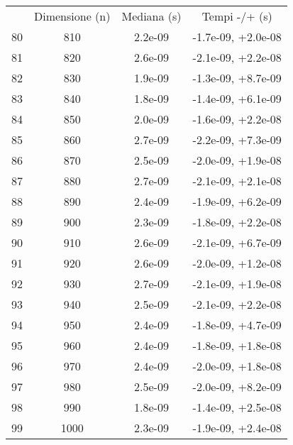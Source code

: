 \begin{table}
\centering
\begin{adjustbox}{width=1\textwidth/2}
\begin{tabular}{|c|c|c|c|}
\hline
 & Dimensione (n) & Mediana (s) & Tempi -/+ (s) \\
80 & 810 & 2.2e-09 & -1.7e-09, +2.0e-08 \\
\cline{1-4}
81 & 820 & 2.6e-09 & -2.1e-09, +2.2e-08 \\
\cline{1-4}
82 & 830 & 1.9e-09 & -1.3e-09, +8.7e-09 \\
\cline{1-4}
83 & 840 & 1.8e-09 & -1.4e-09, +6.1e-09 \\
\cline{1-4}
84 & 850 & 2.0e-09 & -1.6e-09, +2.2e-08 \\
\cline{1-4}
85 & 860 & 2.7e-09 & -2.2e-09, +7.3e-09 \\
\cline{1-4}
86 & 870 & 2.5e-09 & -2.0e-09, +1.9e-08 \\
\cline{1-4}
87 & 880 & 2.7e-09 & -2.1e-09, +2.1e-08 \\
\cline{1-4}
88 & 890 & 2.4e-09 & -1.9e-09, +6.2e-09 \\
\cline{1-4}
89 & 900 & 2.3e-09 & -1.8e-09, +2.2e-08 \\
\cline{1-4}
90 & 910 & 2.6e-09 & -2.1e-09, +6.7e-09 \\
\cline{1-4}
91 & 920 & 2.6e-09 & -2.0e-09, +1.2e-08 \\
\cline{1-4}
92 & 930 & 2.7e-09 & -2.1e-09, +1.9e-08 \\
\cline{1-4}
93 & 940 & 2.5e-09 & -2.1e-09, +2.2e-08 \\
\cline{1-4}
94 & 950 & 2.4e-09 & -1.8e-09, +4.7e-09 \\
\cline{1-4}
95 & 960 & 2.4e-09 & -1.8e-09, +1.8e-08 \\
\cline{1-4}
96 & 970 & 2.4e-09 & -2.0e-09, +1.8e-08 \\
\cline{1-4}
97 & 980 & 2.5e-09 & -2.0e-09, +8.2e-09 \\
\cline{1-4}
98 & 990 & 1.8e-09 & -1.4e-09, +2.5e-08 \\
\cline{1-4}
99 & 1000 & 2.3e-09 & -1.9e-09, +2.4e-08 \\
\cline{1-4}
\end{tabular}
\end{adjustbox}
\end{table}
